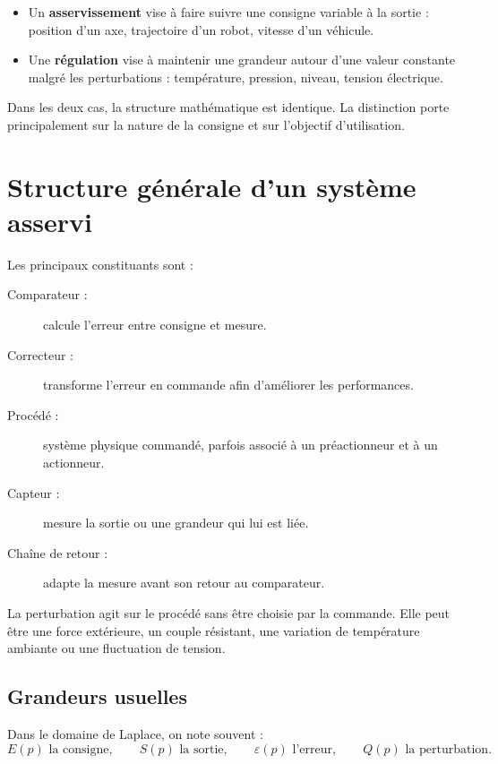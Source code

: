 \begin{itemize}
  \item Un \textbf{asservissement} vise à faire suivre une consigne variable à la sortie : position d'un axe, trajectoire d'un robot, vitesse d'un véhicule.
  \item Une \textbf{régulation} vise à maintenir une grandeur autour d'une valeur constante malgré les perturbations : température, pression, niveau, tension électrique.
\end{itemize}

Dans les deux cas, la structure mathématique est identique. La distinction porte principalement sur la nature de la consigne et sur l'objectif d'utilisation.

\section{Structure générale d'un système asservi}\label{sec:sa-structure}

\SAChaineAsservie

Les principaux constituants sont :

\begin{description}
  \item[Comparateur :] calcule l'erreur entre consigne et mesure.
  \item[Correcteur :] transforme l'erreur en commande afin d'améliorer les performances.
  \item[Procédé :] système physique commandé, parfois associé à un préactionneur et à un actionneur.
  \item[Capteur :] mesure la sortie ou une grandeur qui lui est liée.
  \item[Chaîne de retour :] adapte la mesure avant son retour au comparateur.
\end{description}

La perturbation agit sur le procédé sans être choisie par la commande. Elle peut être une force extérieure, un couple résistant, une variation de température ambiante ou une fluctuation de tension.

\TLSchemaPerturbe

\subsection{Grandeurs usuelles}

Dans le domaine de Laplace, on note souvent :
\[
E(p)\text{ la consigne},\qquad S(p)\text{ la sortie},\qquad
\varepsilon(p)\text{ l'erreur},\qquad Q(p)\text{ la perturbation}.
\]

